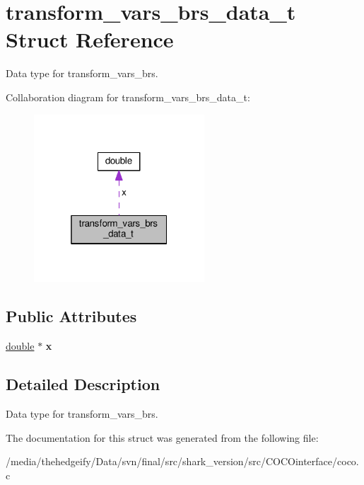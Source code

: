 \hypertarget{structtransform__vars__brs__data__t}{}\section{transform\+\_\+vars\+\_\+brs\+\_\+data\+\_\+t Struct Reference}
\label{structtransform__vars__brs__data__t}


Data type for transform\+\_\+vars\+\_\+brs.  




Collaboration diagram for transform\+\_\+vars\+\_\+brs\+\_\+data\+\_\+t\+:\nopagebreak
\begin{figure}[H]
\begin{center}
\leavevmode
\includegraphics[width=181pt]{structtransform__vars__brs__data__t__coll__graph}
\end{center}
\end{figure}
\subsection*{Public Attributes}
\begin{DoxyCompactItemize}
\item 
\hyperlink{classdouble}{double} $\ast$ {\bfseries x}\hypertarget{structtransform__vars__brs__data__t_a3b7f4392fe0b3d02b52710574cfc8dc7}{}\label{structtransform__vars__brs__data__t_a3b7f4392fe0b3d02b52710574cfc8dc7}

\end{DoxyCompactItemize}


\subsection{Detailed Description}
Data type for transform\+\_\+vars\+\_\+brs. 

The documentation for this struct was generated from the following file\+:\begin{DoxyCompactItemize}
\item 
/media/thehedgeify/\+Data/svn/final/src/shark\+\_\+version/src/\+C\+O\+C\+Ointerface/coco.\+c\end{DoxyCompactItemize}
